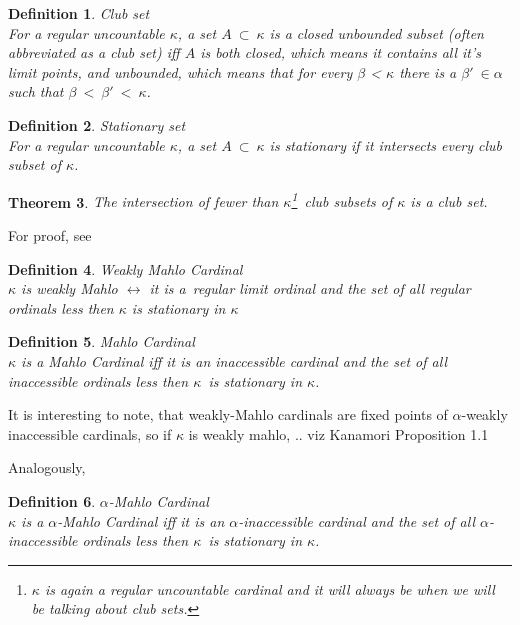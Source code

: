 \documentclass[12pt,a4paper]{article}
\newtheorem{theorem}{Theorem}[section]
\newtheorem{definition}[theorem]{Definition}
\renewcommand{\iff}{\leftrightarrow}
\begin{document}
\begin{definition}{Club set}\\
For a regular uncountable $\kappa$, a set $A\ \subset\ \kappa$ is a \emph{closed unbounded} subset (often abbreviated as a \emph{club set}) iff $A$ is both closed, which means it contains all it's limit points, and unbounded, which means that for every $\beta$ < $\kappa$ there is a $\beta'\ \in \alpha$ such that $\beta\ <\ \beta'\ <\ \kappa$.
\end{definition}

\begin{definition}{Stationary set}\\
For a regular uncountable $\kappa$, a set $A\ \subset\ \kappa$ is stationary if it intersects every club subset of $\kappa$.
\end{definition}

\begin{theorem}{}\label{club_intersection} 
The intersection of fewer than $\kappa$\footnote{$\kappa$ is again a regular uncountable cardinal and it will always be when we will be talking about club sets.} club subsets of $\kappa$ is a club set.
\end{theorem}
For proof, see \cite[Theorem 8.3]{JechBook}

\begin{definition}{Weakly Mahlo Cardinal}\label{def:weakly_mahlo}\\
$\kappa$ is \emph{weakly Mahlo} $\iff$ it is a~regular limit ordinal and the set of all regular ordinals less then $\kappa$ is stationary in $\kappa$
\end{definition}

\begin{definition}{Mahlo Cardinal}\label{def:mahlo_cardinal}\\
$\kappa$ is a \emph{Mahlo Cardinal} iff it is an inaccessible cardinal and the set of all inaccessible ordinals less then $\kappa$ is stationary in $\kappa$.
\end{definition}
It is interesting to note, that weakly-Mahlo cardinals are fixed points of $\alpha$-weakly inaccessible cardinals, so if $\kappa$ is weakly mahlo,  .. viz Kanamori Proposition 1.1

Analogously, 
\begin{definition}{$\alpha$-Mahlo Cardinal}\label{def:alpha_mahlo_cardinal}\\
$\kappa$ is a \emph{$\alpha$-Mahlo Cardinal} iff it is an $\alpha$-inaccessible cardinal and the set of all $\alpha$-inaccessible ordinals less then $\kappa$ is stationary in $\kappa$.
\end{definition}
\end{document}
